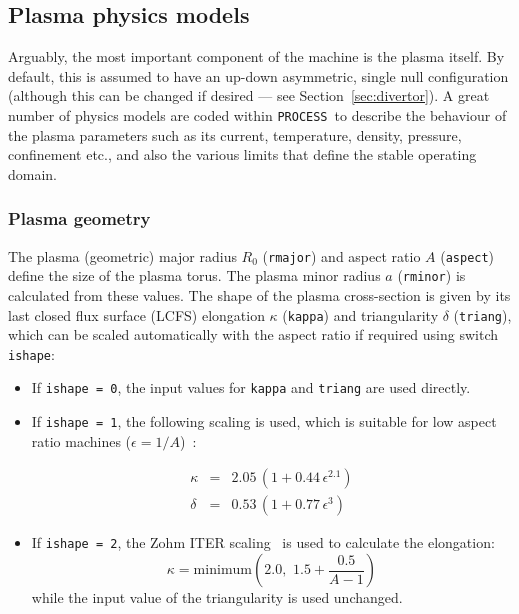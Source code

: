 \documentclass[11pt,a4paper]{report}
\newcommand{\process}{\mbox{\texttt{PROCESS}}}
\begin{document}
\subsection{Plasma physics models}

Arguably, the most important component of the machine is the plasma itself. By
default, this is assumed to have an up-down asymmetric, single null
configuration (although this can be changed if desired --- see
Section~\ref{sec:divertor}). A great number of physics models are coded within
\process\ to describe the behaviour of the plasma parameters such as its
current, temperature, density, pressure, confinement etc., and also the
various limits that define the stable operating domain.

\subsubsection{Plasma geometry}
\label{sec:plasma_geometry}

The plasma (geometric) major radius $R_0$ (\texttt{rmajor}) and aspect ratio
$A$ (\texttt{aspect}) define the size of the plasma torus. The plasma minor
radius $a$ (\texttt{rminor}) is calculated from these values. The shape of the
plasma cross-section is given by its last closed flux surface (LCFS) elongation
$\kappa$ (\texttt{kappa}) and triangularity $\delta$ (\texttt{triang}), which
can be scaled automatically with the aspect ratio if required using switch
\texttt{ishape}:

\begin{itemize}

\item If \texttt{ishape = 0}, the input values for \texttt{kappa} and
  \texttt{triang} are used directly.

\item If \texttt{ishape = 1}, the following scaling is used, which is suitable
  for low aspect ratio machines ($\epsilon = 1/A$)~\cite{storac}:

\begin{eqnarray}
\kappa & = & 2.05 \, (1 + 0.44 \, \epsilon^{2.1}) \\
\delta & = & 0.53 \, (1 + 0.77 \, \epsilon^3)
\end{eqnarray}

\item If \texttt{ishape = 2}, the Zohm ITER scaling~\cite{Zohm} is used to
  calculate the elongation:
\begin{equation}
\kappa = \mathrm{minimum} \left( 2.0, \, \, 1.5 + \frac{0.5}{A-1} \right)
\end{equation}
while the input value of the triangularity is used unchanged.

\end{itemize}
\end{document}
